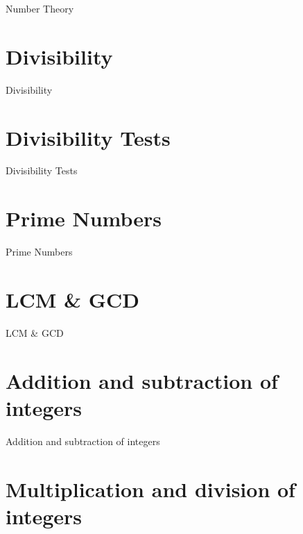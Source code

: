 Number Theory

\section{Divisibility}
\label{sec:divisibility}

Divisibility

\section{Divisibility Tests}
\label{sec:divisibility-tests}

Divisibility Tests

\section{Prime Numbers}
\label{sec:prime-numbers}

Prime Numbers

\section{LCM \& GCD}
\label{sec:lcm-gcd}

LCM \& GCD

\section{Addition and subtraction of integers}
\label{sec:addition-and-subtraction-of-integers}

Addition and subtraction of integers

\section{Multiplication and division of integers}
\label{sec:multiplication-and-division-of-integers}

